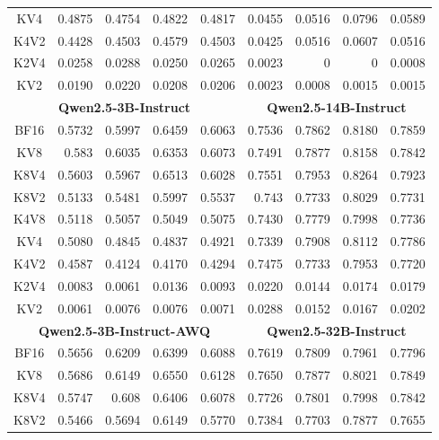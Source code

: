 \begin{table}
{\begin{tabular}{ c | r r r r | r r r r }
KV4 & 0.4875 & 0.4754 & 0.4822 & 0.4817 & 0.0455 & 0.0516 & 0.0796 & \colorbox{blue!30}{0.0589} \\ 
K4V2 & 0.4428 & 0.4503 & 0.4579 & \colorbox{blue!30}{0.4503} & 0.0425 & 0.0516 & 0.0607 & \colorbox{blue!30}{0.0516} \\ 
K2V4 & 0.0258 & 0.0288 & 0.0250 & \colorbox{blue!30}{0.0265} & 0.0023 & 0 & 0  & \colorbox{blue!30}{0.0008} \\ 
KV2  & 0.0190 & 0.0220 & 0.0208 & \colorbox{blue!30}{0.0206} & 0.0023 & 0.0008 & 0.0015 & \colorbox{blue!30}{0.0015}  \\ \hline
\multicolumn{5}{c}{\textbf{Qwen2.5-3B-Instruct}} & \multicolumn{4}{c}{\textbf{Qwen2.5-14B-Instruct}} \\  \hline
BF16 & 0.5732 & 0.5997 & 0.6459 & 0.6063 & 0.7536 & 0.7862 & 0.8180 & 0.7859 \\  \hline
KV8 & 0.583 & 0.6035 & 0.6353 & 0.6073 & 0.7491 & 0.7877 & 0.8158 &  0.7842 \\
K8V4 & 0.5603 & 0.5967 & 0.6513 & 0.6028 & 0.7551 & 0.7953 & 0.8264 & 0.7923\\ 
K8V2 & 0.5133 & 0.5481 & 0.5997 & \colorbox{blue!30}{0.5537} & 0.743 & 0.7733 & 0.8029 & 0.7731\\
K4V8 & 0.5118 & 0.5057 & 0.5049 & \colorbox{blue!30}{0.5075} & 0.7430 & 0.7779 & 0.7998 & 0.7736\\ 
KV4 & 0.5080 & 0.4845 & 0.4837 & \colorbox{blue!30}{0.4921} & 0.7339 & 0.7908 & 0.8112 & 0.7786\\ 
K4V2 & 0.4587 & 0.4124 & 0.4170 & \colorbox{blue!30}{0.4294} & 0.7475 & 0.7733 & 0.7953 & 0.7720\\ 
K2V4 & 0.0083 & 0.0061 & 0.0136 & \colorbox{blue!30}{0.0093} & 0.0220 & 0.0144 & 0.0174 & \colorbox{blue!30}{0.0179}\\ 
KV2  & 0.0061 & 0.0076 & 0.0076 & \colorbox{blue!30}{0.0071} & 0.0288 & 0.0152 & 0.0167 & \colorbox{blue!30}{0.0202}\\ \hline
\multicolumn{5}{c}{\textbf{Qwen2.5-3B-Instruct-AWQ}} & \multicolumn{4}{c}{\textbf{Qwen2.5-32B-Instruct}} \\ \hline
BF16 & 0.5656 & 0.6209 & 0.6399 & 0.6088 & 0.7619 & 0.7809 & 0.7961 & 0.7796 \\ \hline
KV8 & 0.5686 & 0.6149 & 0.6550 & 0.6128 & 0.7650 & 0.7877 & 0.8021 & 0.7849 \\
K8V4 & 0.5747 & 0.608 & 0.6406 & 0.6078 & 0.7726 & 0.7801 & 0.7998 & 0.7842 \\ 
K8V2 & 0.5466 & 0.5694 & 0.6149 & \colorbox{blue!30}{0.5770} & 0.7384 & 0.7703 & 0.7877 & 0.7655 \\

\end{tabular}}
\end{table}
